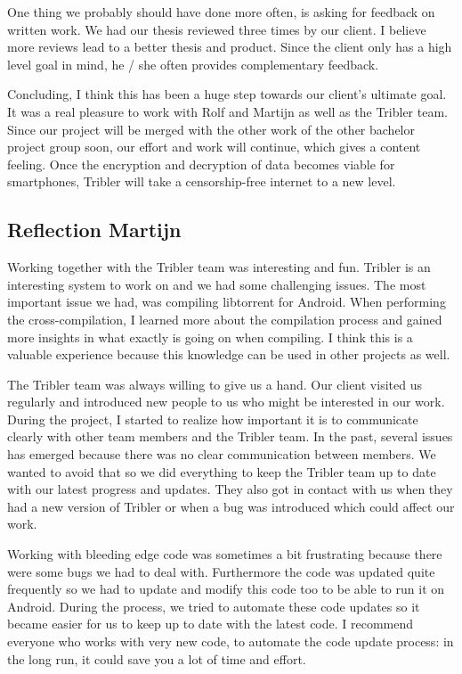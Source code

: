 			
			One thing we probably should have done more often, is asking for feedback on written work. We had our thesis reviewed three times by our client. I believe more reviews lead to a better thesis and product. Since the client only has a high level goal in mind, he / she often provides complementary feedback.
			
			
			Concluding, I think this has been a huge step towards our client's ultimate goal. It was a real pleasure to work with Rolf and Martijn as well as the Tribler team. Since our project will be merged with the other work of the other bachelor project group soon, our effort and work will continue, which gives a content feeling. Once the encryption and decryption of data becomes viable for smartphones, Tribler will take a censorship-free internet to a new level.
		
		\subsection{Reflection Martijn}
			Working together with the Tribler team was interesting and fun. Tribler is an interesting system to work on and we had some challenging issues. The most important issue we had, was compiling libtorrent for Android. When performing the cross-compilation, I learned more about the compilation process and gained more insights in what exactly is going on when compiling. I think this is a valuable experience because this knowledge can be used in other projects as well.
		
			The Tribler team was always willing to give us a hand. Our client visited us regularly and introduced new people to us who might be interested in our work. During the project, I started to realize how important it is to communicate clearly with other team members and the Tribler team. In the past, several issues has emerged because there was no clear communication between members. We wanted to avoid that so we did everything to keep the Tribler team up to date with our latest progress and updates. They also got in contact with us when they had a new version of Tribler or when a bug was introduced which could affect our work.
		
			Working with bleeding edge code was sometimes a bit frustrating because there were some bugs we had to deal with. Furthermore the code was updated quite frequently so we had to update and modify this code too to be able to run it on Android. During the process, we tried to automate these code updates so it became easier for us to keep up to date with the latest code. I recommend everyone who works with very new code, to automate the code update process: in the long run, it could save you a lot of time and effort.
		
